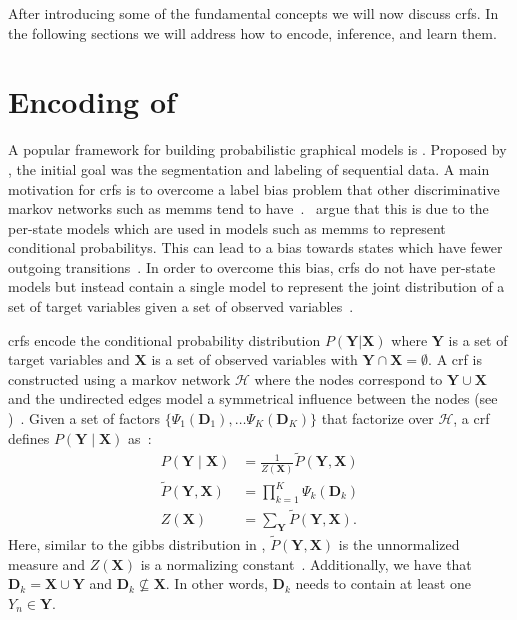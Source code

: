 \bigskip

After introducing some of the fundamental concepts we will now discuss \glspl{crf}. In the following sections we will address how to encode, inference, and learn them.

\section{Encoding of }\label{sec:definition-crfs}
A popular framework for building \glspl{probabilistic graphical model} is .
Proposed by \citet{lafferty2001conditional}, the initial goal was the segmentation and labeling of sequential data.
A main motivation for \glspl{crf} is to overcome a label bias problem that other discriminative \glspl{markov network} such as \glspl{memm} tend to have~\citep{lafferty2001conditional}.\
\citet{lafferty2001conditional} argue that this is due to the per-state models which are used in models such as \glspl{memm} to represent \glspl{conditional probability}.
This can lead to a bias towards states which have fewer outgoing transitions~\citep{lafferty2001conditional}.
In order to overcome this bias, \glspl{crf} do not have per-state models but instead contain a single model to represent the \gls{joint distribution} of a set of \glspl{target variable} given a set of \glspl{observed variable}~\citep{lafferty2001conditional}.

\bigskip

\Glspl{crf} encode the \gls{conditional probability distribution} $P(\mathbf{Y}|\mathbf{X})$ where $\mathbf{Y}$ is a set of \glspl{target variable} and $\mathbf{X}$ is a set of \glspl{observed variable} with $\mathbf{Y}\cap\mathbf{X}=\emptyset$.
A \gls{crf} is constructed using a \gls{markov network} $\mathcal{H}$ where the nodes correspond to $\mathbf{Y}\cup\mathbf{X}$ and the undirected edges model a symmetrical influence between the nodes (see \Cref{subsec:graphical-models})~\citep{koller2009probabilistic}.
Given a set of \glspl{factor} $\{\Psi_1(\mathbf{D}_1),\dots\Psi_K(\mathbf{D}_K)\}$ that factorize over $\mathcal{H}$, a \gls{crf} defines $P(\mathbf{Y}\mid\mathbf{X})$ as~\citep{koller2009probabilistic}:
\begin{equation}
  \label{equ:crf-factor}
  \begin{split}
    P(\mathbf{Y}\mid\mathbf{X}) & = \frac{1}{Z(\mathbf{X})}\tilde{P}(\mathbf{Y},\mathbf{X}) \\
    \tilde{P}(\mathbf{Y},\mathbf{X}) &= \prod_{k=1}^{K}\Psi_k\left(\mathbf{D}_k\right) \\
    Z(\mathbf{X}) & = \sum_{\mathbf{Y}}\tilde{P}(\mathbf{Y},\mathbf{X}).
  \end{split}
\end{equation}
Here, similar to the \gls{gibbs distribution} in , $\tilde{P}(\mathbf{Y},\mathbf{X})$ is the unnormalized measure and $Z(\mathbf{X})$ is a \gls{normalizing constant}~\citep{koller2009probabilistic}.
Additionally, we have that $\mathbf{D}_k=\mathbf{X}\cup\mathbf{Y}$ and $\mathbf{D}_k\not\subseteq\mathbf{X}$.
In other words, $\mathbf{D}_k$ needs to contain at least one $Y_n\in \mathbf{Y}$.

